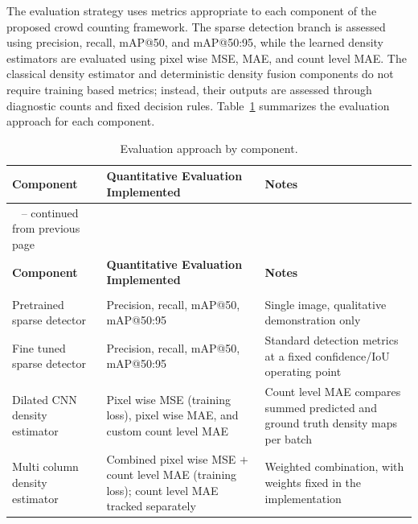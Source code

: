 The evaluation strategy uses metrics appropriate to each component of the proposed crowd counting framework. The sparse detection branch is assessed using precision, recall, mAP@50, and mAP@50:95, while the learned density estimators are evaluated using pixel wise MSE, MAE, and count level MAE. The classical density estimator and deterministic density fusion components do not require training based metrics; instead, their outputs are assessed through diagnostic counts and fixed decision rules. Table~\ref{tab:metrics} summarizes the evaluation approach for each component.

\begin{longtable}{|
		>{\raggedright\arraybackslash}p{}|
		>{\raggedright\arraybackslash}p{}|
		>{\raggedright\arraybackslash}p{}|}
	
	\caption{Evaluation approach by component.}
	\label{tab:metrics}\\
	
	\hline
	\textbf{Component} &
	\textbf{Quantitative Evaluation Implemented} &
	\textbf{Notes} \\
	\hline
	\endfirsthead
	
	\multicolumn{3}{c}%
	{{\tablename\ \thetable{} -- continued from previous page}} \\
	\hline
	\textbf{Component} &
	\textbf{Quantitative Evaluation Implemented} &
	\textbf{Notes} \\
	\hline
	\endhead
	
	\hline
	\multicolumn{3}{r}{{Continued on next page}} \\
	\endfoot
	
	\hline
	\endlastfoot
	
	Pretrained sparse detector
	&
	Precision, recall, mAP@50, mAP@50:95
	&
	Single image, qualitative demonstration only
	\\
	\hline
	
	Fine tuned sparse detector
	&
	Precision, recall, mAP@50, mAP@50:95
	&
	Standard detection metrics at a fixed confidence/IoU operating point
	\\
	\hline
		
	Dilated CNN density estimator
	&
	Pixel wise MSE (training loss), pixel wise MAE, and custom count level MAE
	&
	Count level MAE compares summed predicted and ground truth density maps per batch
	\\
	\hline
	
	Multi column density estimator
	&
	Combined pixel wise MSE $+$ count level MAE (training loss); count level MAE tracked separately
	&
	Weighted combination, with weights fixed in the implementation
	\\
	\hline
	
\end{longtable}


